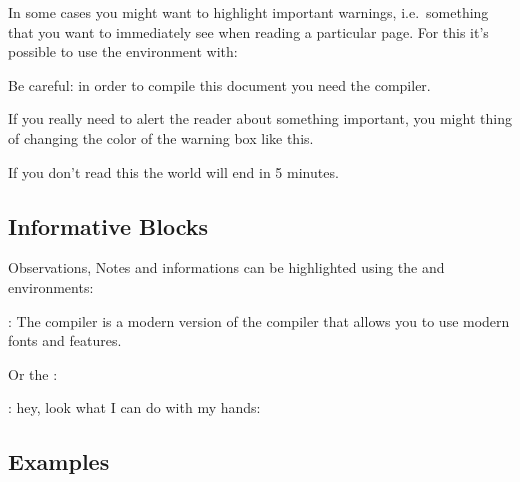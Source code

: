 \documentclass[../main.tex]{subfiles}
\begin{document}
In some cases you might want to highlight important warnings, i.e.\ something
that you want to immediately see when reading a particular page. For this it's
possible to use the  environment with:

\begin{center}
\end{center}

\begin{warning}
	Be careful: in order to compile this document you need the  compiler.
\end{warning}

If you really need to alert the reader about something important, you might thing of changing the color of the warning box like this.

\begin{warning}
	If you don't read this the world will end in 5 minutes. 
\end{warning}

\vspace{2cm}

\subsection{Informative Blocks}

Observations, Notes and informations can be highlighted using the  and
 environments:

\begin{center}
\end{center}

\begin{info}
	: The  compiler is a modern version of the  compiler that allows you to use modern fonts and features.
\end{info}

Or the :

\begin{center}
\end{center}

\begin{blueinfo}
	: hey, look what I can do with my hands:
\end{blueinfo}

\pagebreak
\subsection{Examples}
\end{document}
